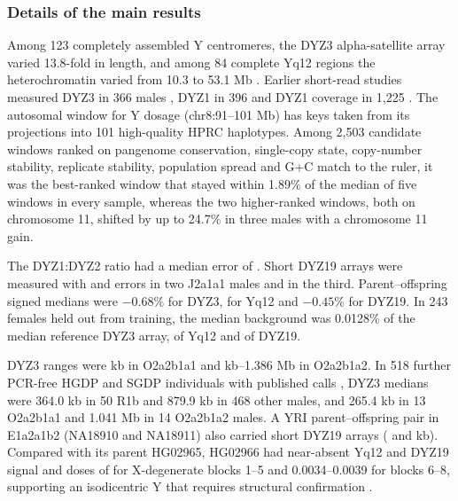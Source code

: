 \subsubsection{Details of the main results}\label{sec:res-main}
Among 123 completely assembled Y centromeres, the DYZ3 alpha-satellite array varied 13.8-fold in length, and among 84 complete Yq12 regions the heterochromatin varied from 10.3 to 53.1 Mb \cite{Hallast2026}. Earlier short-read studies measured DYZ3 in 366 males \cite{Miga2014}, DYZ1 in 396 \cite{Altemose2014} and DYZ1 coverage in 1,225 \cite{SanRoman2024}. The autosomal window for Y dosage (chr8:91--101 Mb) has keys taken from its projections into 101 high-quality HPRC haplotypes. Among 2,503 candidate windows ranked on pangenome conservation, single-copy state, copy-number stability, replicate stability, population spread and G+C match to the ruler, it was the best-ranked window that stayed within 1.89\% of the median of five windows in every sample, whereas the two higher-ranked windows, both on chromosome 11, shifted by up to 24.7\% in three males with a chromosome 11 gain.

The DYZ1:DYZ2 ratio had a median error of . Short DYZ19 arrays were measured with  and  errors in two J2a1a1 males and  in the third. Parent--offspring signed medians were $-0.68\%$ for DYZ3,  for Yq12 and $-0.45\%$ for DYZ19. In 243 females held out from training, the median background was 0.0128\% of the median reference DYZ3 array,  of Yq12 and  of DYZ19.

DYZ3 ranges were  kb in O2a2b1a1 and  kb--1.386 Mb in O2a2b1a2. In 518 further PCR-free HGDP and SGDP individuals with published calls \cite{Hallast2021}, DYZ3 medians were 364.0 kb in 50 R1b and 879.9 kb in 468 other males, and 265.4 kb in 13 O2a2b1a1 and 1.041 Mb in 14 O2a2b1a2 males. A YRI parent--offspring pair in E1a2a1b2 (NA18910 and NA18911) also carried short DYZ19 arrays ( and  kb).  Compared with its parent HG02965, HG02966 had near-absent Yq12 and DYZ19 signal and doses of  for X-degenerate blocks 1--5 and 0.0034--0.0039 for blocks 6--8, supporting an isodicentric Y that requires structural confirmation \cite{Porubsky2025}.

